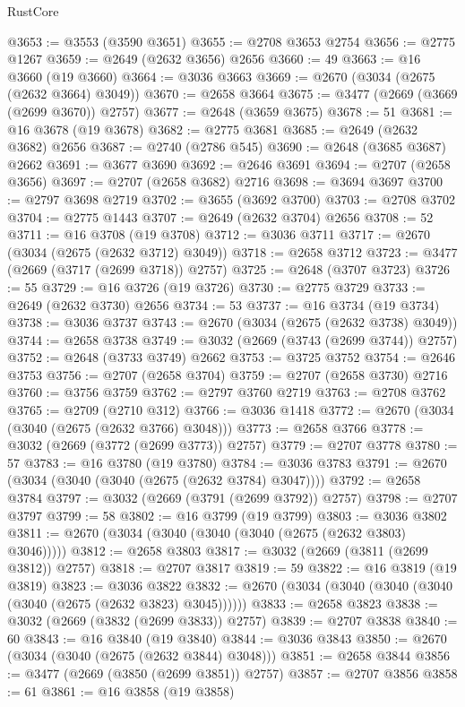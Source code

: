 \begin{lexlean}{RustCore}
\begin{coremodule}
@3653 := @3553 (@3590 @3651)
@3655 := @2708 @3653 @2754
@3656 := @2775 @1267
@3659 := @2649 (@2632 @3656) @2656
@3660 := 49
@3663 := @16 @3660 (@19 @3660)
@3664 := @3036 @3663
@3669 := @2670 (@3034 (@2675 (@2632 @3664) @3049))
@3670 := @2658 @3664
@3675 := @3477 (@2669 (@3669 (@2699 @3670)) @2757)
@3677 := @2648 (@3659 @3675)
@3678 := 51
@3681 := @16 @3678 (@19 @3678)
@3682 := @2775 @3681
@3685 := @2649 (@2632 @3682) @2656
@3687 := @2740 (@2786 @545)
@3690 := @2648 (@3685 @3687) @2662
@3691 := @3677 @3690
@3692 := @2646 @3691
@3694 := @2707 (@2658 @3656)
@3697 := @2707 (@2658 @3682) @2716
@3698 := @3694 @3697
@3700 := @2797 @3698 @2719
@3702 := @3655 (@3692 @3700)
@3703 := @2708 @3702
@3704 := @2775 @1443
@3707 := @2649 (@2632 @3704) @2656
@3708 := 52
@3711 := @16 @3708 (@19 @3708)
@3712 := @3036 @3711
@3717 := @2670 (@3034 (@2675 (@2632 @3712) @3049))
@3718 := @2658 @3712
@3723 := @3477 (@2669 (@3717 (@2699 @3718)) @2757)
@3725 := @2648 (@3707 @3723)
@3726 := 55
@3729 := @16 @3726 (@19 @3726)
@3730 := @2775 @3729
@3733 := @2649 (@2632 @3730) @2656
@3734 := 53
@3737 := @16 @3734 (@19 @3734)
@3738 := @3036 @3737
@3743 := @2670 (@3034 (@2675 (@2632 @3738) @3049))
@3744 := @2658 @3738
@3749 := @3032 (@2669 (@3743 (@2699 @3744)) @2757)
@3752 := @2648 (@3733 @3749) @2662
@3753 := @3725 @3752
@3754 := @2646 @3753
@3756 := @2707 (@2658 @3704)
@3759 := @2707 (@2658 @3730) @2716
@3760 := @3756 @3759
@3762 := @2797 @3760 @2719
@3763 := @2708 @3762
@3765 := @2709 (@2710 @312)
@3766 := @3036 @1418
@3772 := @2670 (@3034 (@3040 (@2675 (@2632 @3766) @3048)))
@3773 := @2658 @3766
@3778 := @3032 (@2669 (@3772 (@2699 @3773)) @2757)
@3779 := @2707 @3778
@3780 := 57
@3783 := @16 @3780 (@19 @3780)
@3784 := @3036 @3783
@3791 := @2670 (@3034 (@3040 (@3040 (@2675 (@2632 @3784) @3047))))
@3792 := @2658 @3784
@3797 := @3032 (@2669 (@3791 (@2699 @3792)) @2757)
@3798 := @2707 @3797
@3799 := 58
@3802 := @16 @3799 (@19 @3799)
@3803 := @3036 @3802
@3811 := @2670 (@3034 (@3040 (@3040 (@3040 (@2675 (@2632 @3803) @3046)))))
@3812 := @2658 @3803
@3817 := @3032 (@2669 (@3811 (@2699 @3812)) @2757)
@3818 := @2707 @3817
@3819 := 59
@3822 := @16 @3819 (@19 @3819)
@3823 := @3036 @3822
@3832 := @2670 (@3034 (@3040 (@3040 (@3040 (@3040 (@2675 (@2632 @3823) @3045))))))
@3833 := @2658 @3823
@3838 := @3032 (@2669 (@3832 (@2699 @3833)) @2757)
@3839 := @2707 @3838
@3840 := 60
@3843 := @16 @3840 (@19 @3840)
@3844 := @3036 @3843
@3850 := @2670 (@3034 (@3040 (@2675 (@2632 @3844) @3048)))
@3851 := @2658 @3844
@3856 := @3477 (@2669 (@3850 (@2699 @3851)) @2757)
@3857 := @2707 @3856
@3858 := 61
@3861 := @16 @3858 (@19 @3858)

\end{coremodule}
\end{lexlean}
